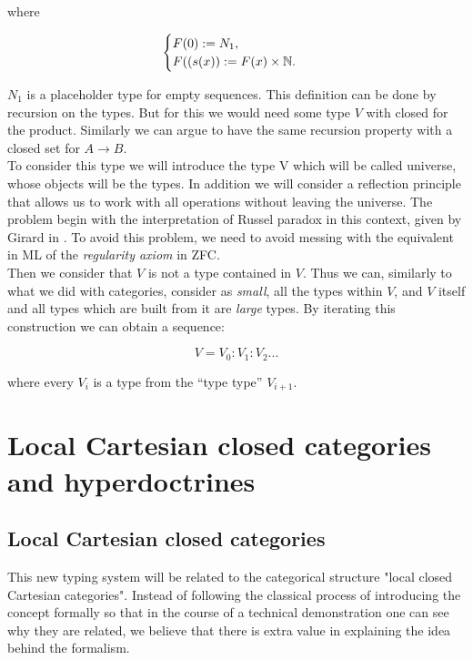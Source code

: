 where

\[   
     \begin{cases}
       F(0):= N_1,\\
       F((s(x)):= F(x)\times \mathbb{N}.
     \end{cases}
\]

$N_1$ is a placeholder type for empty sequences. This definition can be done by recursion on the types. But for this we would need some type $V$ with closed for the product. Similarly we can argue to have the same recursion property with a closed set for $A \to B$.\\ 

To consider this type we will introduce the type V which will be called universe, whose objects will be the types. In addition we will consider a reflection principle that allows us to work with all operations without leaving the universe.  The problem begin with the interpretation of Russel paradox in this context, given by Girard in \cite{girard1972interpretation}. To avoid this problem, we need to avoid messing with the equivalent in ML of the \emph{regularity axiom} in ZFC.\\


Then we consider that $V$ is not a type contained in $V$. Thus we can, similarly to what we did with categories, consider as \emph{small}, all the types within $V$, and $V$ itself and all types which are built from it are \emph{large} types. By iterating this construction we can obtain a sequence:

$$V = V_0 : V_1 : V_2 ...$$

where every $V_i$ is a type from the ``type type'' $V_{i+1}$. 


\section{Local Cartesian closed categories and hyperdoctrines}
\subsection{Local Cartesian closed categories}
This new typing system will be related to the categorical structure "local closed Cartesian categories". Instead of following the classical process of introducing the concept formally so that in the course of a technical demonstration one can see why they are related, we believe that there is extra value in explaining the idea behind the formalism.\\


